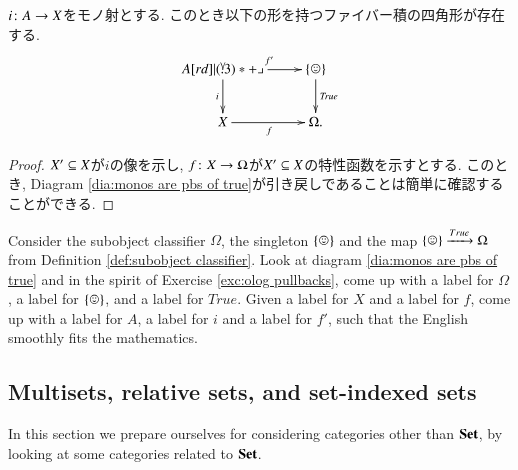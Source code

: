 \begin{corollary}\label{cor:monos are pullbacks of true}

$i\taking A\to X$をモノ射とする. このとき以下の形を持つファイバー積の四角形が存在する.
\begin{align}\label{dia:monos are pbs of true}
\xymatrix{A\ar[r]^{f'}\ar[d]_i\ullimit&\singleton\ar[d]^{\mathit{True}}\\X\ar[r]_f&\Omega.}
\end{align}

\end{corollary}

\begin{proof}


$X'\ss X$が$i$の像を示し, $f\taking X\to\Omega$が$X'\ss X$の特性函数を示すとする. このとき, Diagram \ref{dia:monos are pbs of true}が引き戻しであることは簡単に確認することができる.

\end{proof}

\begin{exercise}
Consider the subobject classifier $\Omega$, the singleton $\singleton$ and the map $\singleton\To{True}\Omega$ from Definition \ref{def:subobject classifier}. Look at diagram \ref{dia:monos are pbs of true} and in the spirit of Exercise \ref{exc:olog pullbacks}, come up with a label for $\Omega$, a label for $\singleton$, and a label for $True$. Given a label for $X$ and a label for $f$, come up with a label for $A$, a label for $i$ and a label for $f'$, such that the English smoothly fits the mathematics.
\end{exercise}


\subsection{Multisets, relative sets, and set-indexed sets}

In this section we prepare ourselves for considering categories other than $\Set$, by looking at some categories related to $\Set$. 


